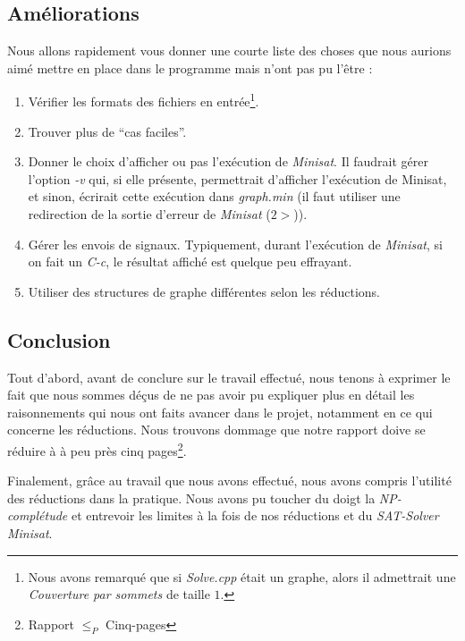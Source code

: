   \subsection{Améliorations}
  Nous allons rapidement vous donner une courte liste des choses que
  nous aurions aimé mettre en place dans le programme mais n'ont pas pu
  l'être :
  \begin{enumerate}
   \item Vérifier les formats des fichiers en entrée\footnote{Nous avons
	 remarqué que si \emph{Solve.cpp} était un graphe, alors il
	 admettrait une \emph{Couverture par sommets} de taille $1$.}. 
   \item Trouver plus de ``cas faciles''.
   \item Donner le choix d'afficher ou pas l'exécution de
	 \emph{Minisat}. Il faudrait gérer l'option \emph{-v} qui, si
	 elle présente, permettrait d'afficher l'exécution de Minisat,
	 et sinon, écrirait cette exécution dans \emph{graph.min} (il
	 faut utiliser une redirection de la sortie d'erreur de
	 \emph{Minisat} ($2>$)).
   \item Gérer les envois de signaux. Typiquement, durant l'exécution de
	 \emph{Minisat}, si on fait un \emph{C-c}, le résultat affiché
	 est quelque peu effrayant.
   \item Utiliser des structures de graphe différentes selon les
	 réductions.
  \end{enumerate}
  
  \subsection{Conclusion}
  Tout d'abord, avant de conclure sur le travail effectué, nous tenons à
  exprimer le fait que nous sommes déçus de ne pas avoir pu expliquer
  plus en détail les raisonnements qui nous ont faits avancer dans le
  projet, notamment en ce qui concerne les réductions. Nous trouvons
  dommage que notre rapport doive se réduire à à peu près cinq
  pages\footnote{Rapport $\leq_P$ Cinq-pages}.

  Finalement, grâce au travail que nous avons effectué, nous avons
  compris l'utilité des réductions dans la pratique. Nous avons pu
  toucher du doigt la \emph{NP-complétude} et entrevoir les limites à la
  fois de nos réductions et du \emph{SAT-Solver Minisat}.